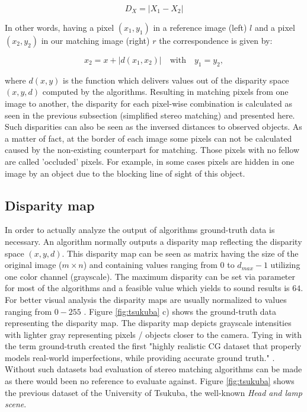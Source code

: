 \begin{equation}
  D_X = |X_1 - X_2|
\end{equation}

\noindent In other words, having a pixel $(x_1,y_1)$ in a reference image (left) $l$ and a pixel $(x_2,y_2)$ in our matching image (right) $r$ the correspondence is given by:

\begin{equation}
  x_2 = x + |d(x_1,x_2)|\quad \textrm{with}\quad y_1 = y_2,
\end{equation}

\noindent where $d(x,y)$ is the function which delivers values out of the disparity space $(x,y,d)$ computed by the algorithms.
\newline\newline\noindent Resulting in matching pixels from one image to another, the disparity for each pixel-wise combination is calculated as seen in the previous subsection (simplified stereo matching) and presented here.
Such disparities can also be seen as the inversed distances to observed objects.
As a matter of fact, at the border of each image some pixels can not be calculated caused by the non-existing counterpart for matching.
Those pixels with no fellow are called 'occluded' pixels.
For example, in some cases pixels are hidden in one image by an object due to the blocking line of sight of this object.

\subsection*{Disparity map}

In order to actually analyze the output of algorithms ground-truth data is necessary.
An algorithm normally outputs a disparity map reflecting the disparity space $(x,y,d)$.
This disparity map can be seen as matrix having the size of the original image ($m \times n$) and containing values ranging from $0$ to $d_{max} - 1$ utilizing one color channel (grayscale).
The maximum disparity can be set via parameter for most of the algorithms and a feasible value which yields to sound results is $64$.
For better visual analysis the disparity maps are usually normalized to values ranging from $0 - 255$ \citep{martull2012realistic, cyganek2011introduction, scharstein2002taxonomy}.
Figure \ref{fig:tsukuba} c) shows the ground-truth data representing the disparity map.
The disparity map depicts grayscale intensities with lighter gray representing pixels / objects closer to the camera.
\newline\newline\noindent Tying in with the term ground-truth \citeauthor{martull2012realistic} created the first "highly realistic CG dataset that properly models real-world imperfections, while providing accurate ground truth." \citep{martull2012realistic}.
Without such datasets bad evaluation of stereo matching algorithms can be made as there would been no reference to evaluate against.
Figure \ref{fig:tsukuba} shows the previous dataset of the University of Tsukuba, the well-known \textit{Head and lamp scene}.

